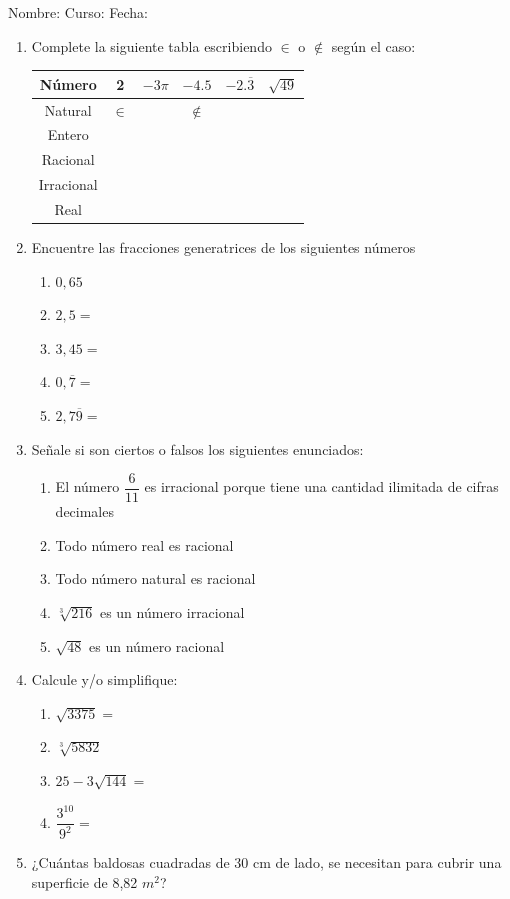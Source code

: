 \documentclass[fleqn]{article}
\newcommand{\LineaNombre}{%
\par
\vspace{\baselineskip}
Nombre:\hrulefill \; Curso: \underline{\hspace*{36pt}} \; Fecha: \underline{\hspace*{2.5cm}} \relax
\par}
\begin{document}
\LineaNombre
\begin{enumerate}
   \item Complete la siguiente tabla escribiendo $\in$ o $\not\in$ según el caso:
\begin{center}
   \begin{tabular}{|c|c|c|c|c|c|}
\hline 
Número & 2 & $-3\pi$ & $-4.5$ & $-2.\overline{3}$ & $\sqrt{49}$ \\ 
\hline 
Natural & $\in$ &  & $\not\in$ &  &  \\ 
\hline 
Entero &  &  &  &  &  \\ 
\hline 
Racional &  &  &  &  &  \\ 
\hline 
Irracional &  &  &  &  &  \\ 
\hline 
Real &  &  &  &  &  \\ 
\hline 
\end{tabular} 
\end{center}
 \item Encuentre las fracciones generatrices de los siguientes números
\begin{enumerate}
\item $0,65$\noanswer
\item $2,5=$\noanswer
\item $3,45=$\noanswer
\item $0,\overline{7}=$\noanswer
\item $2,7\overline{9}=$\noanswer
\end{enumerate}
\item Señale si son ciertos o falsos los siguientes enunciados:
\begin{enumerate}
\item El número $\dfrac{6}{11}$ es irracional porque tiene una cantidad ilimitada de cifras decimales \underline{\hspace*{20pt}}
\item Todo número real es racional \underline{\hspace*{20pt}}
\newpage
\item Todo número natural es racional \underline{\hspace*{20pt}}
\item $\sqrt[3]{216}$ es un número irracional \underline{\hspace*{20pt}}
\item $\sqrt{48}$ es un número racional \underline{\hspace*{20pt}}
\end{enumerate}
\item Calcule y/o simplifique:
\begin{enumerate}
\item $\sqrt{3375}=$ \noanswer
\item $\sqrt[3]{5832}$\noanswer
\item $25-3\sqrt{144}=$\noanswer
\item $\dfrac{3^{10}}{9^{2}}=$\noanswer
\end{enumerate}
\item ¿Cuántas baldosas cuadradas de 30 cm de lado, se necesitan para cubrir una superficie de 8,82 $m^{2}$?\noanswer[2in]
\end{enumerate}
\end{document}
